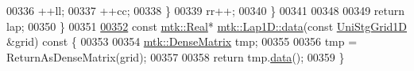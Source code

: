 \begin{DoxyCode}
00336       ++ll;
00337       ++cc;
00338     \}
00339     rr++;
00340   \}
00341 
00348 
00349   \textcolor{keywordflow}{return} lap;
00350 \}
00351 
\hypertarget{mtk__lap__1d_8cc_source_l00352}{}\hyperlink{classmtk_1_1Lap1D_ab2652725a8407c79247680c7bbd073b8}{00352} \textcolor{keyword}{const} \hyperlink{group__c01-roots_gac080bbbf5cbb5502c9f00405f894857d}{mtk::Real}* \hyperlink{classmtk_1_1Lap1D_ab2652725a8407c79247680c7bbd073b8}{mtk::Lap1D::data}(\textcolor{keyword}{const} \hyperlink{classmtk_1_1UniStgGrid1D}{UniStgGrid1D} &grid)\textcolor{keyword}{ const }\{
00353 
00354   \hyperlink{classmtk_1_1DenseMatrix}{mtk::DenseMatrix} tmp;
00355 
00356   tmp = ReturnAsDenseMatrix(grid);
00357 
00358   \textcolor{keywordflow}{return} tmp.\hyperlink{classmtk_1_1DenseMatrix_a0c33b8a9e01d157c61ddbdf807c25d84}{data}();
00359 \}
\end{DoxyCode}
